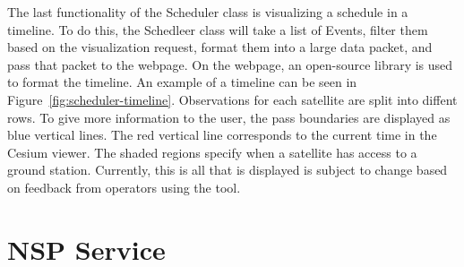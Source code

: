 The last functionality of the Scheduler class is visualizing a schedule in a
timeline. To do this, the Schedleer class will take a list of Events, filter
them based on the visualization request, format them into a large data packet,
and pass that packet to the webpage. On the webpage, an open-source library is
used to format the timeline. An example of a timeline can be seen in
Figure~\ref{fig:scheduler-timeline}. Observations for each satellite are split
into diffent rows. To give more information to the user, the pass boundaries
are displayed as blue vertical lines. The red vertical line corresponds to the
current time in the Cesium viewer. The shaded regions specify when a satellite
has access to a ground station. Currently, this is all that is displayed is
subject to change based on feedback from operators using the tool.



\section{NSP Service}







